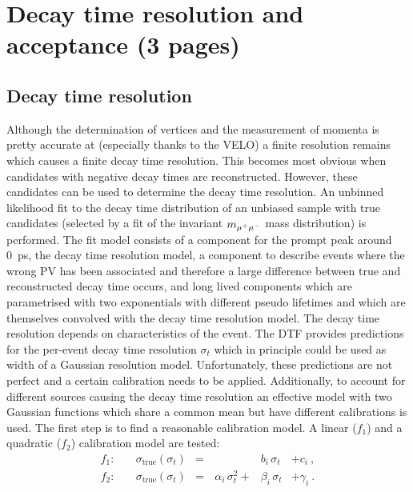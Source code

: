 \newpage
\section{Decay time resolution and acceptance (3 pages)}
\label{sec:bd2jpsiks:decaytime}

\subsection{Decay time resolution}
\label{sec:bd2jpsiks:decaytime:resolution}

Although the determination of vertices and the measurement of momenta is
pretty accurate at \lhcb (especially thanks to the VELO) a finite resolution
remains which causes a finite decay time resolution. This becomes most obvious
when candidates with negative decay times are reconstructed. However, these
candidates can be used to determine the decay time resolution. An unbinned
likelihood fit to the decay time distribution of an unbiased \BdToJPsiKS
sample with true \jpsi candidates (selected by a fit of the invariant
$m_{{\mu^+\mu^-}}$ mass distribution) is performed. The fit model consists of a
component for the prompt peak around \SI{0}{\ps}, \ie the decay time
resolution model, a component to describe events where the wrong PV has been
associated and therefore a large difference between true and reconstructed
decay time occurs, and long lived components which are parametrised with two
exponentials with different pseudo lifetimes and which are themselves
convolved with the decay time resolution model. The decay time resolution
depends on characteristics of the event. The DTF provides predictions for the
per-event decay time resolution $\sigma_t$ which in principle could be used as
width of a Gaussian resolution model. Unfortunately, these predictions are not
perfect and a certain calibration needs to be applied. Additionally, to
account for different sources causing the decay time resolution an effective
model with two Gaussian functions which share a common mean but have different
calibrations is used. The first step is to find a reasonable calibration
model. A linear ($f_1$) and a quadratic ($f_2$) calibration model are tested:
\begin{equation}
\begin{aligned}
f_1:&\quad \sigma_{\text{true}}(\sigma_t) &=&  &b_i\,\sigma_t &+ c_i \ , \\
f_2:&\quad \sigma_{\text{true}}(\sigma_t) &=&\, \alpha_i\,\sigma_t^2 + &\beta_i\,\sigma_t &+ \gamma_i \ .
\end{aligned}
\label{eq:resolutioncalibfunctions}
\end{equation}
